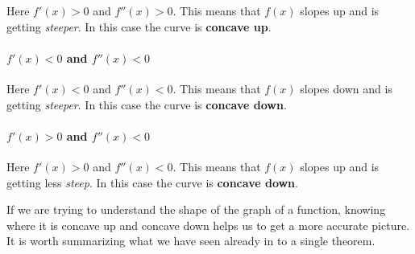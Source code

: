 \documentclass{ximera}
\begin{document}
Here $f'(x)>0$ and $f''(x)>0$. This means that $f(x)$ slopes up and is
getting \textit{steeper}. In this case the curve is \textbf{concave
  up}.

\paragraph{$f'(x)<0$ and $f''(x)<0$}

\begin{image}
\end{image}

Here $f'(x)<0$ and $f''(x)<0$. This means
that $f(x)$ slopes down and is getting \textit{steeper}. In this case the curve is \textbf{concave down}.


\paragraph{$f'(x)>0$ and $f''(x)<0$}

\begin{image}
\end{image}

Here $f'(x)>0$ and $f''(x)<0$. This means that $f(x)$ slopes up and is
getting less \textit{steep}. In this case the curve is \textbf{concave
  down}.

If we are trying to understand the shape of the graph of a function,
knowing where it is concave up and concave down helps us to get a more
accurate picture. It is worth summarizing what we have seen already in
to a single theorem.
\end{document}
